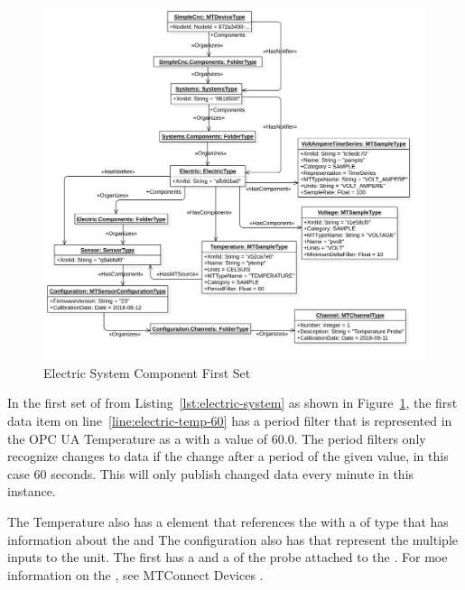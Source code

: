 \begin{figure}[ht]
    \centering
    \includegraphics[width=1.0\textwidth]{diagrams/mtconnect-mapping/electric-system.png}
    \caption{Electric System Component First Set}
    \label{fig:electric-system}
\end{figure}

In the first set of  from Listing~\ref{lst:electric-system} as shown in Figure~\ref{fig:electric-system}, the first data item on line~\ref{line:electric-temp-60} has a period filter that is represented in the OPC UA  Temperature as a   with a value of 60.0. The period filters only recognize changes to data if the change after a period of the given value, in this case 60 seconds. This will only publish changed data every minute in this instance.

The Temperature  also has a  element that references the  with a  of type  that has information about the  and  The  configuration also has  that represent the multiple inputs to the  unit. The first  has a  and a  of the probe attached to the . For moe information on the , see MTConnect Devices \cite{MTCPart2}.

